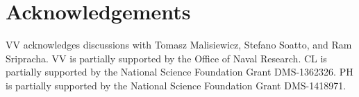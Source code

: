 \documentclass[11pt]{article}
\begin{document}




%
%
%
%
%
%
%
%

\section*{Acknowledgements}
VV acknowledges discussions with Tomasz Malisiewicz, Stefano Soatto, and Ram Sripracha. VV is partially supported by the Office of Naval Research.  CL is partially supported by the National Science Foundation Grant DMS-1362326. PH is partially supported by the National Science Foundation Grant DMS-1418971.


\end{document}
